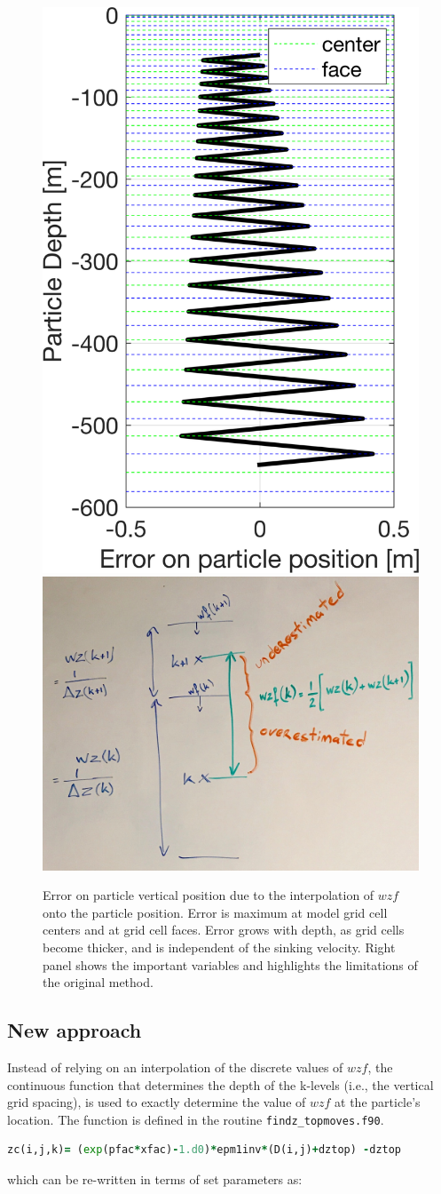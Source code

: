 \documentclass[]{article}
\begin{document}
\begin{figure}[!h]
	\centering
	\includegraphics[width = .35\linewidth]{error.png}
	\includegraphics[width = .64\linewidth]{drawing.jpeg}
	\caption{\label{fig: model_depth_error} Error on particle vertical position due to the interpolation of $wzf$ onto the particle position. Error is maximum at model grid cell centers and at grid cell faces. Error grows with depth, as grid cells become thicker, and is independent of the sinking velocity. Right panel shows the important variables and highlights the limitations of the original method.}
\end{figure}

\subsection*{New approach}
Instead of relying on an interpolation of the discrete values of $wzf$, the continuous function that determines the depth of the k-levels (i.e., the vertical grid spacing), is used to exactly determine the value of $wzf$ at the particle's location. The function is defined in the routine \texttt{findz\_topmoves.f90}.

\begin{lstlisting}[language=fortran]
       zc(i,j,k)= (exp(pfac*xfac)-1.d0)*epm1inv*(D(i,j)+dztop) -dztop
\end{lstlisting}
which can be re-written in terms of set parameters as:
\end{document}
